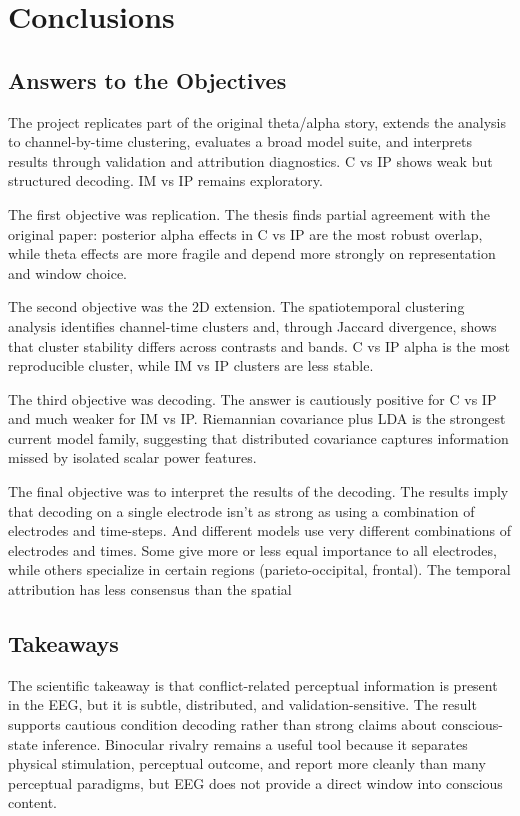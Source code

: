 \documentclass[11pt,a4paper,chapterprefix=false,parskip=false]{scrreprt}
\begin{document}
\chapter{Conclusions}
\label{chap:conclusions}

\section{Answers to the Objectives}
The project replicates part of the original theta/alpha story, extends the analysis to channel-by-time clustering, evaluates a broad model suite, and interprets results through validation and attribution diagnostics. C vs IP shows weak but structured decoding. IM vs IP remains exploratory.

The first objective was replication. The thesis finds partial agreement with the original paper: posterior alpha effects in C vs IP are the most robust overlap, while theta effects are more fragile and depend more strongly on representation and window choice.

The second objective was the 2D extension. The spatiotemporal clustering analysis identifies channel-time clusters and, through Jaccard divergence, shows that cluster stability differs across contrasts and bands. C vs IP alpha is the most reproducible cluster, while IM vs IP clusters are less stable.

The third objective was decoding. The answer is cautiously positive for C vs IP and much weaker for IM vs IP. Riemannian covariance plus LDA is the strongest current model family, suggesting that distributed covariance captures information missed by isolated scalar power features.

The final objective was to interpret the results of the decoding. The results imply that decoding on a single electrode isn't as strong as using a combination of electrodes and time-steps. And different models use very different combinations of electrodes and times. Some give more or less equal importance to all electrodes, while others specialize in certain regions (parieto-occipital, frontal). The temporal attribution has less consensus than the spatial

\section{Takeaways}
The scientific takeaway is that conflict-related perceptual information is present in the EEG, but it is subtle, distributed, and validation-sensitive. The result supports cautious condition decoding rather than strong claims about conscious-state inference. Binocular rivalry remains a useful tool because it separates physical stimulation, perceptual outcome, and report more cleanly than many perceptual paradigms, but EEG does not provide a direct window into conscious content.
\end{document}
